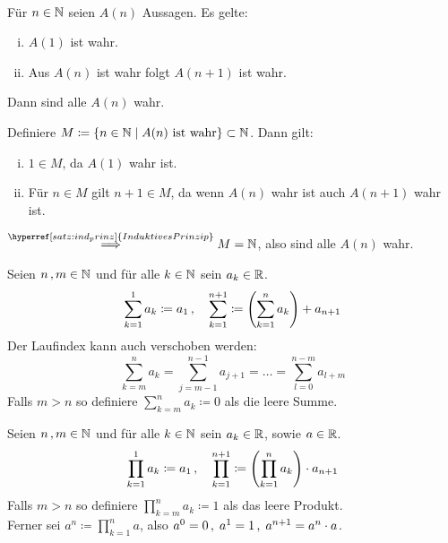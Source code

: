 \documentclass[../ana1.tex]{subfiles}
\begin{document}
\begin{kor}\label{satz:vollst_ind}\leavevmode\\
	Für \(n \in \mathbb{N}\) seien \(A(n)\) Aussagen. Es gelte:
	\begin{enumerate}[(i)]
		\item \(A(1)\) ist wahr.
		\item Aus \(A(n)\) ist wahr folgt \(A(n+1)\) ist wahr.
	\end{enumerate}
	Dann sind alle \(A(n)\) wahr.
\end{kor}
\begin{bew}
	Definiere \(M \coloneqq \{n \in \mathbb{N} \; \vert \; A(n) \text{ ist wahr}\} \subset \mathbb{N}\). Dann gilt:
	\begin{enumerate}[(i)]
		\item \(1\in M\), da \(A(1)\) wahr ist.
		\item Für \(n\in M\) gilt \(n + 1 \in M\), da wenn \(A(n)\) wahr ist auch \(A(n + 1)\) wahr ist.
	\end{enumerate}
	\(\overset{\hyperref[satz:ind_prinz]{Induktives Prinzip}}{\implies} M = \N\), also sind alle \(A(n)\) wahr.
\end{bew}

\begin{defi*}[Summen]Seien \(n \operatorname{,} m \in \mathbb{N}\) und für alle \(k \in \mathbb{N}\) sein \(a_{k} \in \mathbb{R}\).
	\[\sum_{k = 1}^{1} a_{k} \coloneqq a_{1} \operatorname{,} \quad \sum_{k = 1}^{n + 1} \coloneqq \left(\sum_{k = 1}^{n} a_{k} \right) + a_{n + 1}\]
	Der Laufindex kann auch verschoben werden:
	\[\sum_{k = m}^{n} a_{k} = \sum_{j = m - 1}^{n - 1} a_{j + 1} = \ldots = \sum_{l = 0}^{n - m} a_{l + m}\]
	Falls \(m > n\) so definiere \(\sum_{k = m}^{n} a_{k} \coloneqq 0\) als die leere Summe.
\end{defi*}

\begin{defi*}[Produkte]Seien \(n \operatorname{,} m \in \mathbb{N}\) und für alle \(k \in \mathbb{N}\) sein \(a_{k} \in \mathbb{R}\), sowie \(a \in \mathbb{R}\).
	\[\prod_{k = 1}^{1} a_{k} \coloneqq a_{1} \operatorname{,} \quad \prod_{k = 1}^{n + 1} \coloneqq \left(\prod_{k = 1}^{n} a_{k} \right) \cdot a_{n + 1}\]
	Falls \(m > n\) so definiere \(\prod_{k = m}^{n} a_{k} \coloneqq 1\) als das leere Produkt.\\
	Ferner sei \(a^{n} \coloneqq \prod_{k = 1}^{n} a\), also \(a^{0} = 0 \operatorname{,} \; a^{1} = 1 \operatorname{,} \; a^{n + 1} = a^{n} \cdot a\).
\end{defi*}
\end{document}
